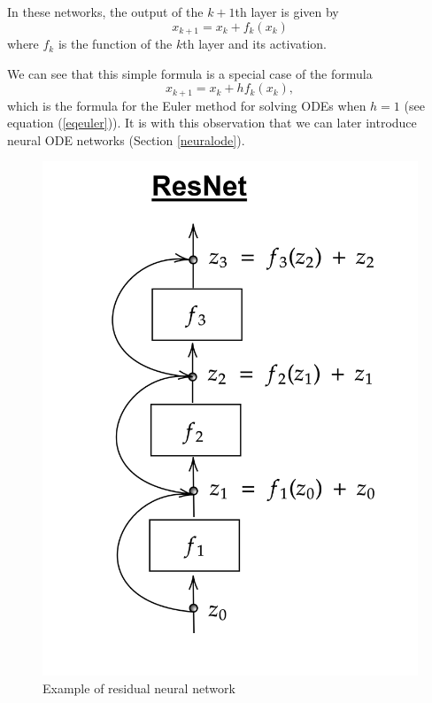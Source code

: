 \documentclass[10pt,a4paper]{article}
\theoremstyle{definition}
\theoremstyle{definition}
\theoremstyle{definition}
\begin{document}
In these networks, the output of the $k+1$th layer is given by
\begin{equation*}
x_{k+1} = x_k + f_k(x_k)
\end{equation*}
where $f_k$ is the function of the $k$th layer and its activation. 

We can see that this simple formula is a special case of the formula
\begin{equation*}
x_{k+1} = x_k + hf_k(x_k),
\end{equation*}
which is the formula for the Euler method for solving ODEs when $h = 1$ (see equation (\ref{eqeuler})). It is with this observation that we can later introduce neural ODE networks (Section \ref{neuralode}).

\begin{figure}
\center
\includegraphics[scale=0.18]{resnet.png}
\caption{Example of residual neural network}
\label{exampleresnet}
\end{figure}
\end{document}
